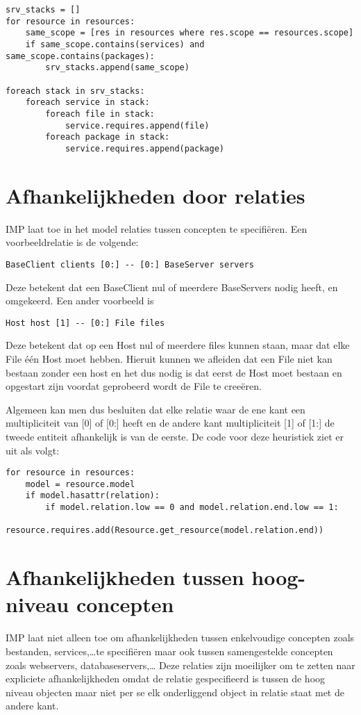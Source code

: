\begin{lstlisting}
srv_stacks = []
for resource in resources:
    same_scope = [res in resources where res.scope == resources.scope]
    if same_scope.contains(services) and same_scope.contains(packages):
        srv_stacks.append(same_scope)

foreach stack in srv_stacks:
    foreach service in stack:
        foreach file in stack:
            service.requires.append(file)
        foreach package in stack:
            service.requires.append(package)
\end{lstlisting}


\section{Afhankelijkheden door relaties}
\label{subs:relaties}
IMP laat toe in het model relaties tussen concepten te specifi\"eren.
Een voorbeeldrelatie is de volgende:
\begin{lstlisting}
BaseClient clients [0:] -- [0:] BaseServer servers
\end{lstlisting}
Deze betekent dat een BaseClient nul of meerdere BaseServers nodig heeft, en omgekeerd.
Een ander voorbeeld is 
\begin{lstlisting}
Host host [1] -- [0:] File files
\end{lstlisting}
Deze betekent dat op een Host nul of meerdere files kunnen staan, maar dat elke File \'e\'en Host moet hebben.
Hieruit kunnen we afleiden dat een File niet kan bestaan zonder een host en het dus nodig is dat eerst de Host moet bestaan en opgestart zijn voordat geprobeerd wordt de File te cree\"eren.

Algemeen kan men dus besluiten dat elke relatie waar de ene kant een multipliciteit van [0] of [0:] heeft en de andere kant multipliciteit [1] of [1:] de tweede entiteit afhankelijk is van de eerste.
De code voor deze heuristiek ziet er uit als volgt:
\begin{lstlisting}
for resource in resources:
    model = resource.model
    if model.hasattr(relation):
        if model.relation.low == 0 and model.relation.end.low == 1:
            resource.requires.add(Resource.get_resource(model.relation.end))
\end{lstlisting}

\section{Afhankelijkheden tussen hoog-niveau concepten}
IMP laat niet alleen toe om afhankelijkheden tussen enkelvoudige concepten zoals bestanden, services,\ldots te specifi\"eren maar ook tussen samengestelde concepten zoals webservers, databaseservers,\ldots
Deze relaties zijn moeilijker om te zetten naar expliciete afhankelijkheden omdat de relatie gespecifieerd is tussen de hoog niveau objecten maar niet per se elk onderliggend object in relatie staat met de andere kant.

